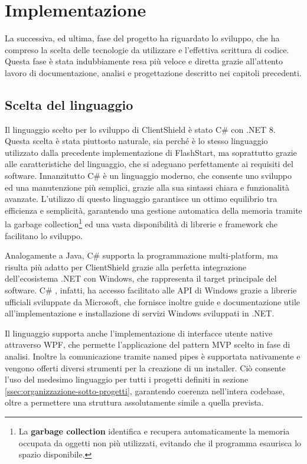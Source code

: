 \documentclass[12pt,a4paper,openright,twoside]{book}
\newcommand{\cs}{C\# }
\begin{document}

\chapter{Implementazione}

La successiva, ed ultima, fase del progetto ha riguardato lo sviluppo, che ha compreso la scelta delle tecnologie da utilizzare e l'effettiva scrittura di codice.
Questa fase è stata indubbiamente resa più veloce e diretta grazie all'attento lavoro di documentazione, analisi e progettazione descritto nei capitoli precedenti.

\section{Scelta del linguaggio}

Il linguaggio scelto per lo sviluppo di ClientShield è stato \cs con .NET 8.
Questa scelta è stata piuttosto naturale, sia perché è lo stesso linguaggio utilizzato dalla precedente implementazione di FlashStart, ma soprattutto grazie alle caratteristiche del linguaggio, che si adeguano perfettamente ai requisiti del software.
Innanzitutto \cs è un linguaggio moderno, che consente uno sviluppo ed una manutenzione più semplici, grazie alla sua sintassi chiara e funzionalità avanzate.
L'utilizzo di questo linguaggio garantisce un ottimo equilibrio tra efficienza e semplicità, garantendo una gestione automatica della memoria tramite la garbage collection\footnote{La \textbf{garbage collection} identifica e recupera automaticamente la memoria occupata da oggetti non più utilizzati, evitando che il programma esaurisca lo spazio disponibile.} ed una vasta disponibilità di librerie e framework che facilitano lo sviluppo.

Analogamente a Java, \cs supporta la programmazione multi-platform, ma risulta più adatto per ClientShield grazie alla perfetta integrazione dell'ecosistema .NET con Windows, che rappresenta il target principale del software.
\cs, infatti, ha accesso facilitato alle API di Windows grazie a librerie ufficiali sviluppate da Microsoft, che fornisce inoltre guide e documentazione utile all'implementazione e installazione di servizi Windows sviluppati in .NET. 

Il linguaggio supporta anche l'implementazione di interfacce utente native attraverso \gls{WPF}, che permette l'applicazione del pattern \gls{MVP} scelto in fase di analisi.
Inoltre la comunicazione tramite named pipes è supportata nativamente e vengono offerti diversi strumenti per la creazione di un installer.
Ciò consente l'uso del medesimo linguaggio per tutti i progetti definiti in sezione \ref{ssec:organizzazione-sotto-progetti}, garantendo coerenza nell'intera codebase, oltre a permettere una struttura assolutamente simile a quella prevista.
\end{document}
